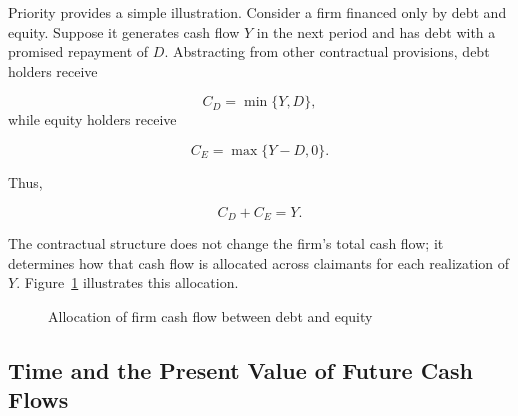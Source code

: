 Priority provides a simple illustration. Consider a firm financed only by debt and equity. Suppose it generates cash flow $Y$ in the next period and has debt with a promised repayment of $D$. Abstracting from other contractual provisions, debt holders receive

\begin{equation}
C_D=\min\{Y,D\},
\label{eq:ch5-debt-payoff}
\end{equation}
while equity holders receive

\begin{equation}
C_E=\max\{Y-D,0\}.
\label{eq:ch5-equity-payoff}
\end{equation}

Thus,

\begin{equation*}
C_D+C_E=Y.
\label{eq:ch5-claim-additivity}
\end{equation*}

The contractual structure does not change the firm's total cash flow; it determines how that cash flow is allocated across claimants for each realization of \(Y\). Figure~\ref{fig:ch5-debt-equity-payoff} illustrates this allocation.

\begin{figure}[H]

\centering

\caption{Allocation of firm cash flow between debt and equity}
\label{fig:ch5-debt-equity-payoff}

\end{figure}

\subsection{Time and the Present Value of Future Cash Flows}

